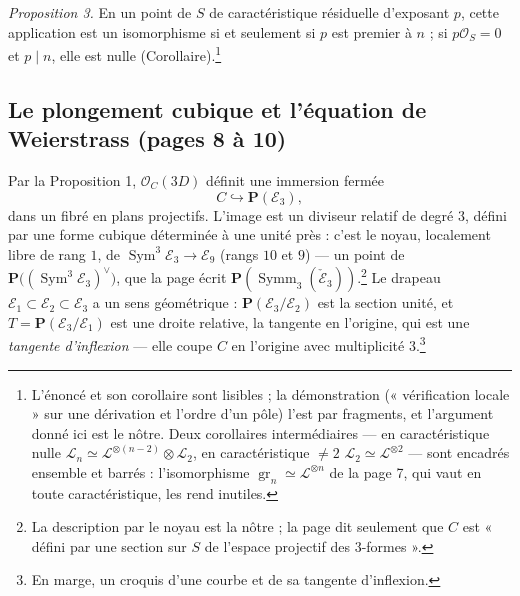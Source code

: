 \documentclass[11pt,a4paper]{article}
\begin{document}
\emph{Proposition 3.} En un point de $S$ de caractéristique résiduelle
d'exposant $p$, cette application est un isomorphisme si et seulement si $p$
est premier à $n$ ; si $p\mathcal{O}_S = 0$ et $p \mid n$, elle est nulle
(Corollaire).\footnote{L'énoncé et son corollaire sont lisibles ; la
démonstration (« vérification locale » sur une dérivation et l'ordre d'un
pôle) l'est par fragments, et l'argument donné ici est le nôtre. Deux
corollaires intermédiaires --- en caractéristique nulle $\mathcal{L}_n \simeq
\mathcal{L}^{\otimes(n-2)} \otimes \mathcal{L}_2$, en caractéristique $\neq 2$
$\mathcal{L}_2 \simeq \mathcal{L}^{\otimes 2}$ --- sont encadrés ensemble et
barrés : l'isomorphisme $\operatorname{gr}_n \simeq \mathcal{L}^{\otimes n}$
de la page 7, qui vaut en toute caractéristique, les rend inutiles.}

\subsection*{Le plongement cubique et l'équation de Weierstrass (pages 8 à 10)}

Par la Proposition 1, $\mathcal{O}_C(3D)$ définit une immersion fermée
\[
C \hookrightarrow \mathbf{P}(\mathcal{E}_3),
\]
dans un fibré en plans projectifs. L'image est un diviseur relatif de degré
$3$, défini par une forme cubique déterminée à une unité près : c'est le noyau,
localement libre de rang $1$, de $\operatorname{Sym}^3\mathcal{E}_3 \to
\mathcal{E}_9$ (rangs $10$ et $9$) --- un point de
$\mathbf{P}\bigl((\operatorname{Sym}^3\mathcal{E}_3)^\vee\bigr)$, que la page
écrit $\mathbf{P}(\operatorname{Symm}_3(\check{\mathcal{E}}_3))$.\footnote{La
description par le noyau est la nôtre ; la page dit seulement que $C$ est
« défini par une section sur $S$ de l'espace projectif des $3$-formes ».} Le
drapeau $\mathcal{E}_1 \subset \mathcal{E}_2 \subset \mathcal{E}_3$ a un sens
géométrique : $\mathbf{P}(\mathcal{E}_3/\mathcal{E}_2)$ est la section unité,
et $T = \mathbf{P}(\mathcal{E}_3/\mathcal{E}_1)$ est une droite relative, la
tangente en l'origine, qui est une \emph{tangente d'inflexion} --- elle coupe
$C$ en l'origine avec multiplicité $3$.\footnote{En marge, un croquis d'une
courbe et de sa tangente d'inflexion.}
\end{document}
